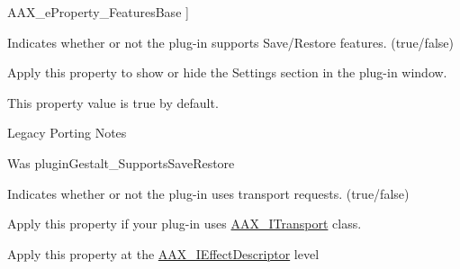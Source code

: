 \begin{Desc}
\begin{description}
{\hypertarget{a00283_a6571f4e41a5dd06e4067249228e2249ea0c1f8d4c8a7569b5e579ef9ede146ec4}{}A\+A\+X\+\_\+e\+Property\+\_\+\+Features\+Base\label{a00283_a6571f4e41a5dd06e4067249228e2249ea0c1f8d4c8a7569b5e579ef9ede146ec4}
}]\item[{\em 
\hypertarget{a00283_a6571f4e41a5dd06e4067249228e2249ea6d42a3a901f36b74e7b9b8a84d4d5298}{}A\+A\+X\+\_\+e\+Property\+\_\+\+Supports\+Save\+Restore\label{a00283_a6571f4e41a5dd06e4067249228e2249ea6d42a3a901f36b74e7b9b8a84d4d5298}
}]Indicates whether or not the plug-\/in supports Save/\+Restore features. ({\ttfamily true/{\ttfamily false})} \begin{DoxyItemize}
\item Apply this property to show or hide the Settings section in the plug-\/in window. \item This property value is true by default.\end{DoxyItemize}
\begin{DoxyRefDesc}{Legacy Porting Notes}
\item[\hyperlink{a00384__porting_notes000059}{Legacy Porting Notes}]Was plugin\+Gestalt\+\_\+\+Supports\+Save\+Restore \end{DoxyRefDesc}
\item[{\em 
\hypertarget{a00283_a6571f4e41a5dd06e4067249228e2249eaf3e1162c5f517595589d513d48158dbd}{}A\+A\+X\+\_\+e\+Property\+\_\+\+Uses\+Transport\label{a00283_a6571f4e41a5dd06e4067249228e2249eaf3e1162c5f517595589d513d48158dbd}
}]Indicates whether or not the plug-\/in uses transport requests. ({\ttfamily true/{\ttfamily false})} \begin{DoxyItemize}
\item Apply this property if your plug-\/in uses \hyperlink{a00116}{A\+A\+X\+\_\+\+I\+Transport} class. \item Apply this property at the \hyperlink{a00096}{A\+A\+X\+\_\+\+I\+Effect\+Descriptor} level \end{DoxyItemize}

\end{description}
\end{Desc}
